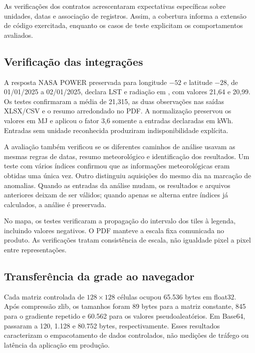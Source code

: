 As verificações dos contratos acrescentaram expectativas específicas sobre unidades, datas e associação de registros. Assim, a cobertura informa a extensão de código exercitada, enquanto os casos de teste explicitam os comportamentos avaliados.

\subsection{Verificação das integrações}\label{sec:resultado-unidades}

A resposta NASA POWER preservada para longitude $-52$ e latitude $-28$, de 01/01/2025 a 02/01/2025, declara LST e radiação em \radiacaoTCC{}, com valores 21,64 e 20,99. Os testes confirmaram a média de 21,315, as duas observações nas saídas XLSX/CSV e o resumo arredondado no PDF. A normalização preservou os valores em MJ e aplicou o fator 3,6 somente a entradas declaradas em kWh. Entradas sem unidade reconhecida produziram indisponibilidade explícita.

A avaliação também verificou se os diferentes caminhos de análise usavam as mesmas regras de datas, resumo meteorológico e identificação dos resultados. Um teste com vários índices confirmou que as informações meteorológicas eram obtidas uma única vez. Outro distinguiu aquisições do mesmo dia na marcação de anomalias. Quando as entradas da análise mudam, os resultados e arquivos anteriores deixam de ser válidos; quando apenas se alterna entre índices já calculados, a análise é preservada.

No mapa, os testes verificaram a propagação do intervalo dos tiles à legenda, incluindo valores negativos. O PDF manteve a escala fixa comunicada no produto. As verificações tratam consistência de escala, não igualdade pixel a pixel entre representações.

\subsection{Transferência da grade ao navegador}\label{sec:transferencia-resultados}

Cada matriz controlada de $128\times128$ células ocupou 65.536 bytes em float32. Após compressão zlib, os tamanhos foram 89 bytes para a matriz constante, 845 para o gradiente repetido e 60.562 para os valores pseudoaleatórios. Em Base64, passaram a 120, 1.128 e 80.752 bytes, respectivamente. Esses resultados caracterizam o empacotamento de dados controlados, não medições de tráfego ou latência da aplicação em produção.

